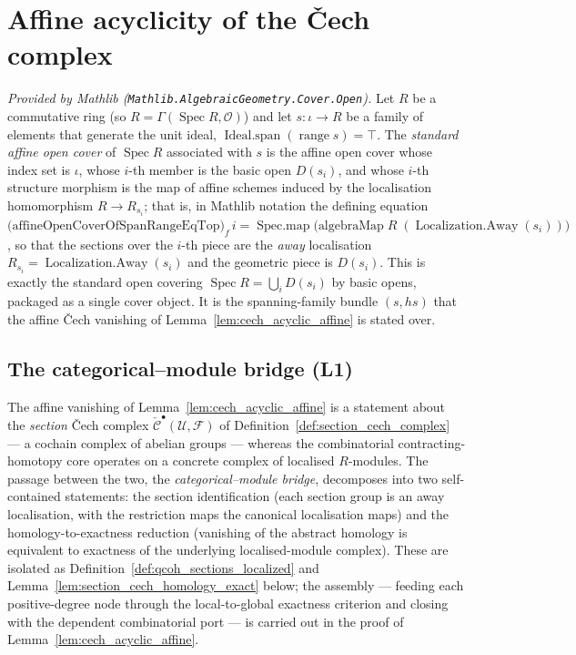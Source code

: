 \section{Affine acyclicity of the {\v C}ech complex}

\begin{definition}
  \label{def:standard_affine_cover}
  \mathlibok
  \textit{Provided by Mathlib (\texttt{Mathlib.AlgebraicGeometry.Cover.Open}).}
  Let \(R\) be a commutative ring (so \(R = \Gamma(\operatorname{Spec} R,
  \mathcal{O})\)) and let \(s : \iota \to R\) be a family of elements that generate
  the unit ideal, \(\operatorname{Ideal.span}(\operatorname{range} s) = \top\). The
  \emph{standard affine open cover} of \(\operatorname{Spec} R\) associated with
  \(s\) is the affine open cover whose index set is \(\iota\), whose \(i\)-th member
  is the basic open \(D(s_i)\), and whose \(i\)-th structure morphism is the map of
  affine schemes induced by the localisation homomorphism \(R \to R_{s_i}\); that
  is, in Mathlib notation the defining equation
  \(\bigl(\text{affineOpenCoverOfSpanRangeEqTop}\bigr)_f\, i =
  \operatorname{Spec.map}\bigl(\text{algebraMap}\; R\; (\operatorname{Localization.Away}(s_i))\bigr)\),
  so that the sections over the \(i\)-th piece are the \emph{away} localisation
  \(R_{s_i} = \operatorname{Localization.Away}(s_i)\) and the geometric piece is
  \(D(s_i)\). This is exactly the standard open covering
  \(\operatorname{Spec} R = \bigcup_i D(s_i)\) by basic opens, packaged as a single
  cover object. It is the spanning-family bundle \((s, hs)\) that the affine
  {\v C}ech vanishing of Lemma~\ref{lem:cech_acyclic_affine} is stated over.
\end{definition}

\subsection{The categorical--module bridge (L1)}
\label{sec:cech_l1_bridge}

The affine vanishing of Lemma~\ref{lem:cech_acyclic_affine} is a statement about the
\emph{section} {\v C}ech complex \(\check{\mathcal{C}}^\bullet(\mathcal{U},
\mathcal{F})\) of Definition~\ref{def:section_cech_complex} --- a cochain complex of
abelian groups --- whereas the combinatorial contracting-homotopy core operates on a
concrete complex of localised \(R\)-modules. The passage between the two, the
\emph{categorical--module bridge}, decomposes into two self-contained statements: the
section identification (each section group is an away localisation, with the
restriction maps the canonical localisation maps) and the homology-to-exactness
reduction (vanishing of the abstract homology is equivalent to exactness of the
underlying localised-module complex). These are isolated as
Definition~\ref{def:qcoh_sections_localized} and
Lemma~\ref{lem:section_cech_homology_exact} below; the assembly --- feeding each
positive-degree node through the local-to-global exactness criterion and closing with
the dependent combinatorial port --- is carried out in the proof of
Lemma~\ref{lem:cech_acyclic_affine}.

